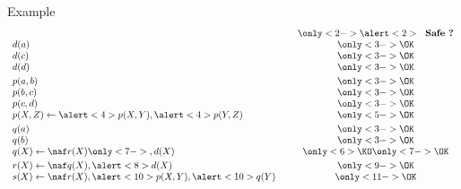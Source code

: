 \begin{frame}[c]{Example}
  \[
  \begin{array}{lcc}
         & \ & \only<2->{\alert<2>{\text{\ \ \textbf{Safe ?}}}}\\
    d(a) & & \only<3->{\OK}\\
    d(c) & & \only<3->{\OK}\\
    d(d) & & \only<3->{\OK}\\[3pt]
    p(a,b) & & \only<3->{\OK}\\
    p(b,c) & & \only<3->{\OK}\\
    p(c,d) & & \only<3->{\OK}\\
    p(X,Z) \leftarrow \alert<4>{p(X,Y)}, \alert<4>{p(Y,Z)} & & \only<5->{\OK}\\[3pt]
    q(a) & & \only<3->{\OK}\\
    q(b) & & \only<3->{\OK}\\
    q(X) \leftarrow \naf r(X)\only<7->{, d(X)} & & \only<6>{\KO}\only<7->{\OK}\\[3pt]
    r(X) \leftarrow \naf q(X), \alert<8>{d(X)} & & \only<9->{\OK}\\
    s(X) \leftarrow \naf r(X), \alert<10>{p(X,Y)}, \alert<10>{q(Y)} & & \only<11->{\OK}\\
  \end{array}
\]
\bigskip
\end{frame}
%
